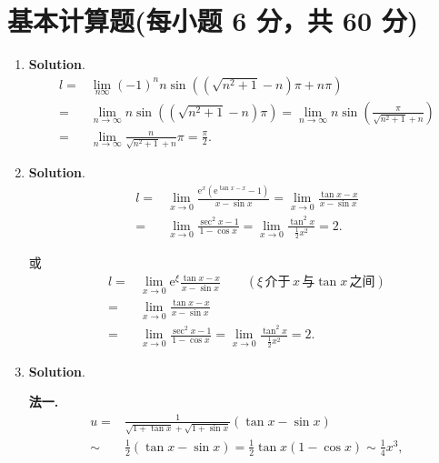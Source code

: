 \documentclass[../Main.tex]{subfiles}
\begin{document}
\section{基本计算题(每小题 6 分，共 60 分)}
\begin{enumerate}
    \item \textbf{Solution}.
          \[
              \begin{aligned}
                  l= & \lim_{n\infty}(-1)^{n} n\sin\left((\sqrt{n^2+1}-n)\pi+n\pi\right)                                                    \\
                  =  & \lim_{n\to\infty}n\sin\left((\sqrt{n^2+1}-n)\pi\right)=\lim_{n\to\infty}n\sin\left(\frac{\pi}{\sqrt{n^2+1}+n}\right) \\
                  =  & \lim_{n\to\infty}\frac{n}{\sqrt{n^2+1}+n}\pi=\frac{\pi}{2}.
              \end{aligned}
          \]

    \item \textbf{Solution}.
          \[
              \begin{aligned}
                  l= & \lim_{x\to 0}\frac{\mathrm{e}^{x}(\mathrm{e}^{\tan x -x}-1)}{x-\sin x}=\lim_{x\to0}\frac{\tan x-x}{x-\sin x} \\
                  =  & \lim_{x\to0}\frac{\sec ^2 x-1}{1-\cos x}=\lim_{x\to0}\frac{\tan^2 x}{\frac{1}{2}x^2}=2.
              \end{aligned}
          \]

          或
          \[
              \begin{aligned}
                  l= & \lim_{x\to 0}\mathrm{e}^{\xi}\frac{\tan x -x}{x-\sin x}\qquad (\xi\,\text{介于}\,x\,\text{与}\tan x\,\text{之间}) \\
                  =  & \lim_{x\to 0}\frac{\tan x -x}{x-\sin x}                                                                      \\
                  =  & \lim_{x\to0}\frac{\sec ^2 x-1}{1-\cos x}=\lim_{x\to0}\frac{\tan^2 x}{\frac{1}{2}x^2}=2.
              \end{aligned}
          \]

    \item \textbf{Solution}.

          \textbf{法一.}
          \[
              \begin{aligned}
                  u=   & \frac{1}{\sqrt{1+\tan x}+\sqrt{1+\sin x}}(\tan x-\sin x)                    \\
                  \sim & \frac{1}{2}(\tan x-\sin x)=\frac{1}{2}\tan x(1-\cos x)\sim\frac{1}{4}x^{3},
              \end{aligned}
          \]


\end{enumerate}
\end{document}
